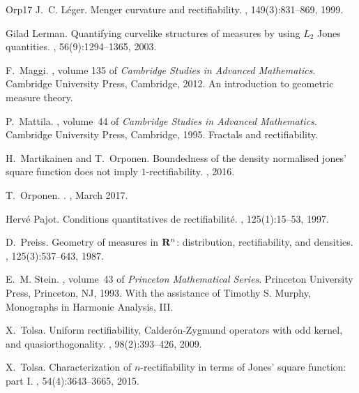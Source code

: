 \documentclass[11pt]{amsart}
\theoremstyle{definition}
\theoremstyle{remark}
\numberwithin{equation}{section}
\begin{document}
\begin{thebibliography}{{Orp}17}
J.~C. L\'eger.
\newblock Menger curvature and rectifiability.
, 149(3):831--869, 1999.

Gilad Lerman.
\newblock Quantifying curvelike structures of measures by using {$L_2$} {J}ones
  quantities.
, 56(9):1294--1365, 2003.

F.~Maggi.
,
  volume 135 of {\em Cambridge Studies in Advanced Mathematics}.
\newblock Cambridge University Press, Cambridge, 2012.
\newblock An introduction to geometric measure theory.

P.~Mattila.
, volume~44
  of {\em Cambridge Studies in Advanced Mathematics}.
\newblock Cambridge University Press, Cambridge, 1995.
\newblock Fractals and rectifiability.

H.~Martikainen and T.~Orponen.
\newblock Boundedness of the density normalised jones' square function does not
  imply $1 $-rectifiability.
, 2016.

T.~{Orponen}.
.
, March 2017.

Herv\'e Pajot.
\newblock Conditions quantitatives de rectifiabilit\'e.
, 125(1):15--53, 1997.

D.~Preiss.
\newblock Geometry of measures in {${\bf R}^n$}: distribution, rectifiability,
  and densities.
, 125(3):537--643, 1987.

E.~M. Stein.
, volume~43 of {\em Princeton Mathematical Series}.
\newblock Princeton University Press, Princeton, NJ, 1993.
\newblock With the assistance of Timothy S. Murphy, Monographs in Harmonic
  Analysis, III.

X.~Tolsa.
\newblock Uniform rectifiability, {C}alder\'on-{Z}ygmund operators with odd
  kernel, and quasiorthogonality.
, 98(2):393--426, 2009.

X.~Tolsa.
\newblock Characterization of {$n$}-rectifiability in terms of {J}ones' square
  function: part {I}.
, 54(4):3643--3665,
  2015.


\end{thebibliography}
\end{document}
